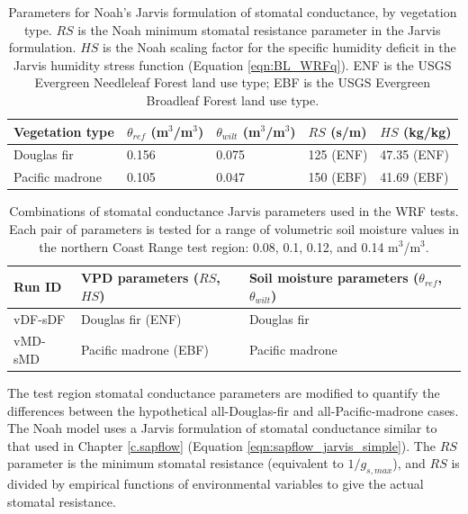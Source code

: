 \begin{table}
\begin{tabular}{ l p{3cm} p{3cm} p{2cm} p{3cm} }
\hline
Vegetation type & $\theta_{ref}$ (m$^3$/m$^3$) & $\theta_{wilt}$ (m$^3$/m$^3$) & $RS$ (s/m) & $HS$ (kg/kg)\\ \hline
Douglas fir & 0.156 & 0.075 & 125 (ENF) & 47.35 (ENF)\\
Pacific madrone & 0.105 & 0.047 & 150 (EBF) & 41.69 (EBF)\\
\hline
\end{tabular}
\caption{Parameters for Noah's Jarvis formulation of stomatal conductance, by vegetation type.  $RS$ is the Noah minimum stomatal resistance parameter in the Jarvis formulation. $HS$ is the Noah scaling factor for the specific humidity deficit in the Jarvis humidity stress function (Equation \ref{eqn:BL_WRFq}).  ENF is the USGS Evergreen Needleleaf Forest land use type; EBF is the USGS Evergreen Broadleaf Forest land use type.}
\label{table:BL_NoahJarvisparams}
\end{table}

\begin{table}
\begin{tabular}{ l p{6cm} p{7cm} }
\hline
Run ID & VPD parameters ($RS$, $HS$) & Soil moisture parameters ($\theta_{ref}$, $\theta_{wilt}$)\\ \hline
vDF-sDF & Douglas fir (ENF) & Douglas fir\\
vMD-sMD & Pacific madrone (EBF) & Pacific madrone\\
\hline
\end{tabular}
\caption{Combinations of stomatal conductance Jarvis parameters used in the WRF tests.  Each pair of parameters is tested for a range of volumetric soil moisture values in the northern Coast Range test region: 0.08, 0.1, 0.12, and 0.14 m$^3$/m$^3$.}
\label{table:BL_WRFruns}
\end{table}

The test region stomatal conductance parameters are modified to quantify the differences between the hypothetical all-Douglas-fir and all-Pacific-madrone cases.  The Noah model uses a Jarvis formulation of stomatal conductance similar to that used in Chapter \ref{c.sapflow} (Equation \ref{eqn:sapflow_jarvis_simple}).  The $RS$ parameter is the minimum stomatal resistance (equivalent to $1/g_{s,max}$), and $RS$ is divided by empirical functions of environmental variables to give the actual stomatal resistance.  

